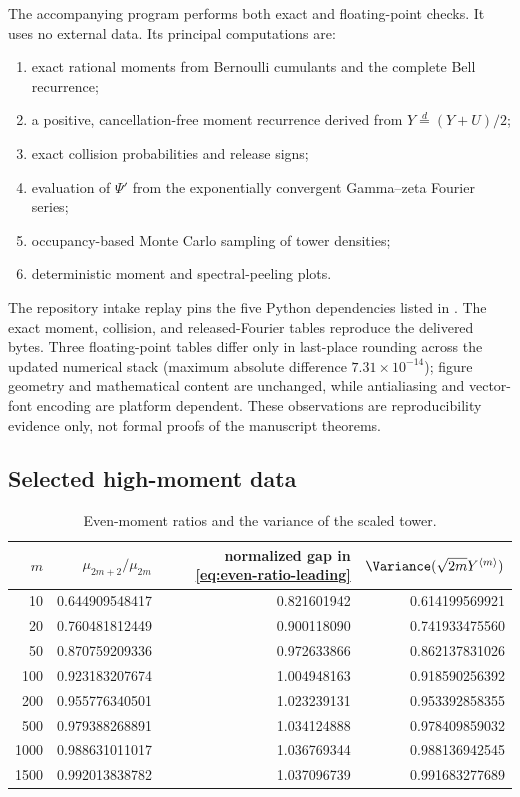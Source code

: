 \documentclass[11pt,oneside]{article}
\theoremstyle{definition}
\theoremstyle{remark}
\newcommand{\Tower}[1]{Y^{\langle #1\rangle}}
\begin{document}
The accompanying program
 performs both exact and floating-point
checks.  It uses no external data.  Its principal computations are:
\begin{enumerate}
\item exact rational moments from Bernoulli cumulants and the complete Bell
      recurrence;
\item a positive, cancellation-free moment recurrence derived from
      $Y\stackrel d=(Y+U)/2$;
\item exact collision probabilities and release signs;
\item evaluation of $\Psi'$ from the exponentially convergent Gamma--zeta
      Fourier series;
\item occupancy-based Monte Carlo sampling of tower densities;
\item deterministic moment and spectral-peeling plots.
\end{enumerate}
The repository intake replay pins the five Python dependencies listed in
.  The exact moment, collision, and released-Fourier
tables reproduce the delivered bytes.  Three floating-point tables differ
only in last-place rounding across the updated numerical stack (maximum
absolute difference $7.31\times10^{-14}$); figure geometry and mathematical
content are unchanged, while antialiasing and vector-font encoding are
platform dependent.  These observations are reproducibility evidence only,
not formal proofs of the manuscript theorems.

\subsection{Selected high-moment data}

\begin{table}[ht]
\centering
\caption{Even-moment ratios and the variance of the scaled tower.}
\label{tab:moment-data}
\small
\begin{tabular}{@{}rrrr@{}}
\toprule
$m$ & $\mu_{2m+2}/\mu_{2m}$
& normalized gap in \eqref{eq:even-ratio-leading}
& $\Variance(\sqrt{2m}\Tower{m})$ \\
\midrule
10   & 0.644909548417 & 0.821601942 & 0.614199569921 \\
20   & 0.760481812449 & 0.900118090 & 0.741933475560 \\
50   & 0.870759209336 & 0.972633866 & 0.862137831026 \\
100  & 0.923183207674 & 1.004948163 & 0.918590256392 \\
200  & 0.955776340501 & 1.023239131 & 0.953392858355 \\
500  & 0.979388268891 & 1.034124888 & 0.978409859032 \\
1000 & 0.988631011017 & 1.036769344 & 0.988136942545 \\
1500 & 0.992013838782 & 1.037096739 & 0.991683277689 \\
\bottomrule
\end{tabular}
\end{table}
\end{document}
